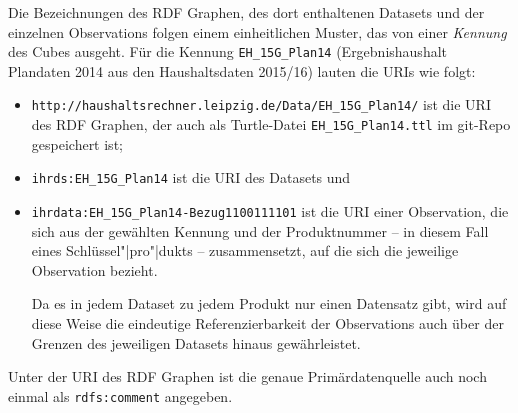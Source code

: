 \documentclass[a4paper,11pt,twoside]{article}
\begin{document}
Die Bezeichnungen des RDF Graphen, des dort enthaltenen Datasets und der
einzelnen Observations folgen einem einheitlichen Muster, das von einer
\emph{Kennung} des Cubes ausgeht.  Für die Kennung \texttt{EH\_15G\_Plan14}
(Ergebnishaushalt Plandaten 2014 aus den Haushaltsdaten 2015/16) lauten die
URIs wie folgt:
\begin{itemize}\itemsep0pt
\item \texttt{http://haushaltsrechner.leipzig.de/Data/EH\_15G\_Plan14/} ist die
  URI des RDF Graphen, der auch als Turtle-Datei \texttt{EH\_15G\_Plan14.ttl}
  im git-Repo gespeichert ist;
\item \texttt{ihrds:EH\_15G\_Plan14} ist die URI des Datasets und 
\item \texttt{ihrdata:EH\_15G\_Plan14-Bezug1100111101} ist die URI einer
  Observation, die sich aus der gewählten Kennung und der Produktnummer -- in
  diesem Fall eines Schlüssel"|pro"|dukts -- zusammensetzt, auf die sich die
  jeweilige Observation bezieht.

  Da es in jedem Dataset zu jedem Produkt nur einen Datensatz gibt, wird auf
  diese Weise die eindeutige Referenzierbarkeit der Observations auch über der
  Grenzen des jeweiligen Datasets hinaus gewährleistet.
\end{itemize}
Unter der URI des RDF Graphen ist die genaue Primärdatenquelle auch noch einmal
als \texttt{rdfs:comment} angegeben. 
\end{document}
